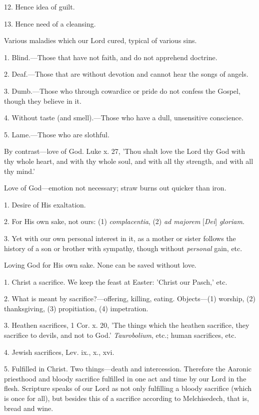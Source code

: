 12. Hence idea of guilt.

13. Hence need of a cleansing.


Various maladies which our Lord cured, typical of
various sins.

1. Blind.—Those that have not faith, and do not
apprehend doctrine.

2. Deaf.—Those that are without devotion and
cannot hear the songs of angels.

3. Dumb.—Those who through cowardice or pride
do not confess the Gospel, though they believe in it.

4. Without taste (and smell).—Those who have a
dull, unsensitive conscience.

5. Lame.—Those who are slothful.


By contrast—love of God. Luke x. 27, 'Thou
shalt love the Lord thy God with thy whole heart, and with thy whole
soul, and with all thy strength, and with all thy mind.'

Love of God—emotion not necessary; straw burns
out quicker than iron.

1. Desire of His exaltation.

2. For His own sake, not ours: (1) \emph{complacentia},
(2) \emph{ad majorem} [\emph{Dei}] \emph{gloriam}.

3. Yet with our own personal interest in it, as a
mother or sister follows the history of a son or brother with
sympathy, though without \emph{personal} gain, etc.

Loving God for His own sake. None can be saved
without love.


1. Christ a sacrifice. We keep the feast at
Easter: 'Christ our Pasch,' etc.

2. What is meant by sacrifice?—offering,
killing, eating. Objects—(1) worship, (2) thanksgiving, (3)
propitiation, (4) impetration.

3. Heathen sacrifices, 1 Cor. x. 20, 'The things
which the heathen sacrifice, they sacrifice to devils, and not to
God.' \emph{Taurobolium}, etc.; human sacrifices, etc.

4. Jewish sacrifices, Lev. ix., x., xvi.

5. Fulfilled in Christ. Two things—death and
intercession. Therefore the Aaronic priesthood and bloody sacrifice
fulfilled in one act and time by our Lord in the flesh. Scripture
speaks of our Lord as not only fulfilling a bloody sacrifice (which is
once for all), but besides this of a sacrifice according to
Melchisedech, that is, bread and wine.

